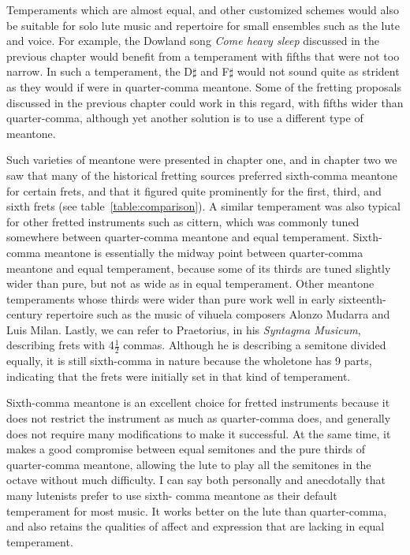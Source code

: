 Temperaments which are almost equal, and other customized schemes would also
be suitable for solo lute music and repertoire for small ensembles such as
the lute and voice. For example, the Dowland song \textit{Come heavy sleep} discussed in
the previous chapter would benefit from a temperament with fifths that were not too
narrow.  In such a temperament,  the D$\sharp$ and F$\sharp$ would not sound quite
as strident as they would if were in quarter-comma meantone. Some of the
fretting proposals discussed in the previous chapter could work in this regard,
with fifths wider than quarter-comma, although yet another solution is to use a
different type of meantone.

Such varieties of meantone were presented in chapter one, and in chapter two we saw that many of the
historical fretting sources preferred sixth-comma meantone for certain frets, and that it figured
quite prominently for the first, third, and sixth frets (see table~\ref{table:comparison}). A
similar temperament was also typical for other fretted instruments such as cittern, which was
commonly tuned somewhere between quarter-comma meantone and equal temperament. \autocite[12]{PF:1}
Sixth-comma meantone is essentially the midway point between quarter-comma meantone and equal
temperament, because some of its thirds are tuned slightly wider than pure, but not as wide as in
equal temperament. Other meantone temperaments whose thirds were wider than pure work well in early
sixteenth-century repertoire such as the music of vihuela composers Alonzo Mudarra and Luis
Milan.\autocite[56]{WH:1} Lastly, we can refer to Praetorius, in his \textit{Syntagma Musicum},
describing frets with 4$ \frac{1}{2} $ commas.\autocite[68]{MP:1} Although he is describing a
semitone divided equally, it is still sixth-comma in nature because the wholetone has 9 parts,
indicating that the frets were initially set in that kind of temperament.

Sixth-comma meantone is an excellent choice for fretted instruments because it does not restrict the
instrument as much as quarter-comma does, and generally does not require many modifications to make
it successful. At the same time, it makes a good compromise between equal semitones and the pure
thirds of quarter-comma meantone, allowing the lute to play all the semitones in the octave without
much difficulty. I can say both personally and anecdotally that many lutenists prefer to use sixth-
comma meantone as their default temperament for most music. It works better on the lute than
quarter-comma, and also retains the qualities of affect and expression that are lacking in equal
temperament.

